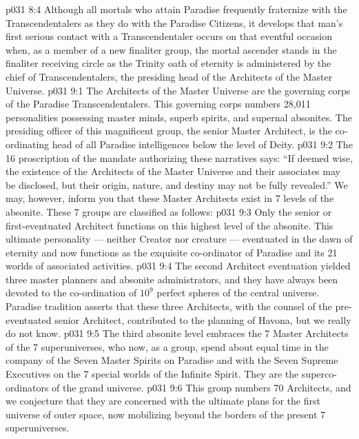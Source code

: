 \vs p031 8:4 Although all mortals who attain Paradise frequently fraternize with the Transcendentalers as they do with the Paradise Citizens, it develops that man’s first serious contact with a Transcendentaler occurs on that eventful occasion when, as a member of a new finaliter group, the mortal ascender stands in the finaliter receiving circle as the Trinity oath of eternity is administered by the chief of Transcendentalers, the presiding head of the Architects of the Master Universe.
\vs p031 9:1 The Architects of the Master Universe are the governing corps of the Paradise Transcendentalers. This governing corps numbers 28,011 personalities possessing master minds, superb spirits, and supernal absonites. The presiding officer of this magnificent group, the senior Master Architect, is the co\hyp{}ordinating head of all Paradise intelligences below the level of Deity.
\vs p031 9:2 The 16 proscription of the mandate authorizing these narratives says: “If deemed wise, the existence of the Architects of the Master Universe and their associates may be disclosed, but their origin, nature, and destiny may not be fully revealed.” We may, however, inform you that these Master Architects exist in 7 levels of the absonite. These 7 groups are classified as follows:
\vs p031 9:3 \bibnobreakspace {} Only the senior or first\hyp{}eventuated Architect functions on this highest level of the absonite. This ultimate personality --- neither Creator nor creature --- eventuated in the dawn of eternity and now functions as the exquisite co\hyp{}ordinator of Paradise and its 21 worlds of associated activities.
\vs p031 9:4 \bibnobreakspace {} The second Architect eventuation yielded three master planners and absonite administrators, and they have always been devoted to the co\hyp{}ordination of $10^9$ perfect spheres of the central universe. Paradise tradition asserts that these three Architects, with the counsel of the pre\hyp{}eventuated senior Architect, contributed to the planning of Havona, but we really do not know.
\vs p031 9:5 \bibnobreakspace {} The third absonite level embraces the 7 Master Architects of the 7 superuniverses, who now, as a group, spend about equal time in the company of the Seven Master Spirits on Paradise and with the Seven Supreme Executives on the 7 special worlds of the Infinite Spirit. They are the superco\hyp{}ordinators of the grand universe.
\vs p031 9:6 \bibnobreakspace {} This group numbers 70 Architects, and we conjecture that they are concerned with the ultimate plans for the first universe of outer space, now mobilizing beyond the borders of the present 7 superuniverses.
